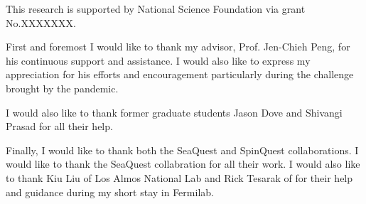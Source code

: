 \begin{acknowledgments}
This research is supported by National Science Foundation via grant No.XXXXXXX.

First and foremost I would like to thank my advisor, Prof. Jen-Chieh Peng, for 
his continuous support and assistance. I would also like to express my 
appreciation for his efforts and encouragement particularly during the 
challenge brought by the pandemic. 

I would also like to thank former graduate students Jason Dove and Shivangi 
Prasad for all their help. 

Finally, I would like to thank both the SeaQuest and SpinQuest collaborations. 
I would like to thank the SeaQuest collabration for all their work. I would 
also like to thank Kiu Liu of Los Almos National Lab and Rick Tesarak of 
for their help and guidance during my short stay in Fermilab.

\end{acknowledgments}

